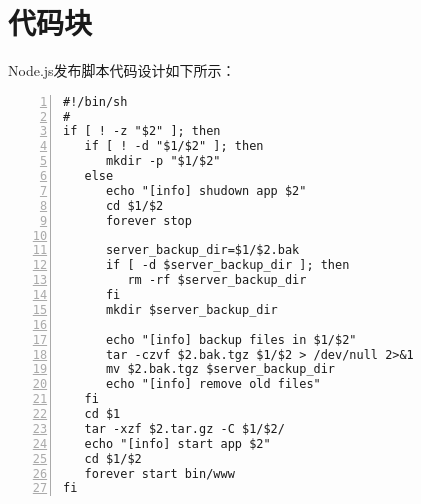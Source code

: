 	\section{代码块}
	Node.js发布脚本代码设计如下所示：
\begin{lstlisting}[language={[ANSI]C},numbers=left,frame=shadowbox,rulesepcolor=\color{gray!2},breaklines=true,backgroundcolor=\color{gray!5},basicstyle=\footnotesize]
#!/bin/sh
#
if [ ! -z "$2" ]; then
   if [ ! -d "$1/$2" ]; then
      mkdir -p "$1/$2"
   else
      echo "[info] shudown app $2"
      cd $1/$2
      forever stop
   
      server_backup_dir=$1/$2.bak
      if [ -d $server_backup_dir ]; then
         rm -rf $server_backup_dir
      fi
      mkdir $server_backup_dir

      echo "[info] backup files in $1/$2"
      tar -czvf $2.bak.tgz $1/$2 > /dev/null 2>&1
      mv $2.bak.tgz $server_backup_dir
      echo "[info] remove old files"
   fi
   cd $1
   tar -xzf $2.tar.gz -C $1/$2/
   echo "[info] start app $2"
   cd $1/$2
   forever start bin/www
fi
\end{lstlisting} 